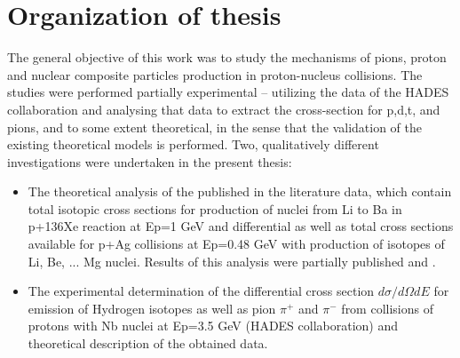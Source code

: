 	\section{Organization of thesis}
	The general objective of this work was to study the mechanisms of pions, proton and nuclear composite particles production in proton-nucleus collisions. The studies were performed partially experimental – utilizing the data of the HADES collaboration and analysing that data to extract the cross-section for p,d,t, and pions, and to some extent theoretical, in the sense that the validation of the existing theoretical models is performed. 
	Two, qualitatively different investigations were undertaken in the present thesis:
	\begin{itemize}
	\item The theoretical analysis of the published in the literature data, which contain total isotopic cross sections for production of nuclei from Li to Ba in p+136Xe reaction at
	Ep=1 GeV and differential as well as total cross sections available for p+Ag collisions at Ep=0.48 GeV with production of isotopes of Li, Be, ... Mg nuclei. Results of this
	analysis were partially published \cite{singh2018predictive} and \cite{singh2019odd}.
	\item The experimental determination of the differential cross section $d\sigma/d\Omega dE$ for emission of Hydrogen isotopes as well as pion $\pi^{+}$ and $\pi^{-} $ from collisions of protons with Nb nuclei at Ep=3.5 GeV (HADES collaboration) and theoretical description of the obtained data.
\end{itemize}